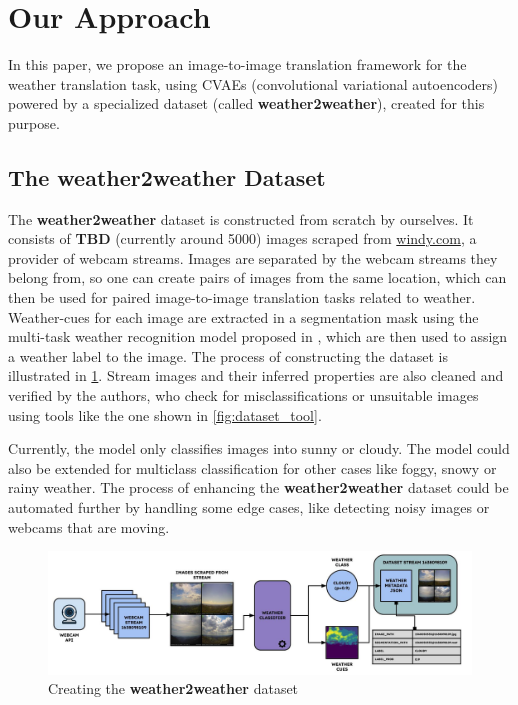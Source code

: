 \documentclass[11pt]{article}
\begin{document}
    \section{Our Approach}

    In this paper, we propose an image-to-image translation framework for the
    weather translation task, using CVAEs (convolutional variational autoencoders)
    powered by a specialized dataset (called \textbf{weather2weather}), created for
    this purpose.

    \subsection{The weather2weather Dataset}

    The \textbf{weather2weather} dataset is constructed from scratch by ourselves. 
    It consists of \textbf{TBD} (currently around 5000) images scraped 
    from \href{windy.com}{windy.com}, a provider of webcam streams. Images are separated 
    by the webcam streams they belong from, so one can create pairs of images from 
    the same location, which can then be used for paired image-to-image translation 
    tasks related to weather. Weather-cues for each image are extracted in a segmentation 
    mask using the multi-task weather recognition model proposed in \cite{ZHAO2019272},  
    which are then used to assign a weather label to the image. The process of 
    constructing the dataset is illustrated in \ref{fig:dataset}. Stream images and 
    their inferred properties are also cleaned and verified by the authors, who 
    check for misclassifications or unsuitable images using tools like the 
    one shown in \ref{fig:dataset_tool}. 

    Currently, the model only classifies images into sunny or cloudy. The model could also be
    extended for multiclass classification for other cases like foggy, snowy or rainy weather.
    The process of enhancing the \textbf{weather2weather} dataset could be automated further
    by handling some edge cases, like detecting noisy images or webcams that are moving. 

    \begin{figure}[!htb]
        \includegraphics[width=\linewidth]{images/dataset_assembly.jpg}
        \caption{Creating the \textbf{weather2weather} dataset}
        \label{fig:dataset}
    \end{figure}
\end{document}
